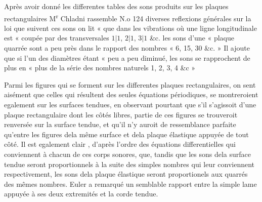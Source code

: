 \documentclass[11pt,a4paper]{article}
\begin{document}
Après avoir donné les differentes tables des sons produits
sur les plaques rectangulaires M\textsuperscript{r} Chladni rassemble N.o 124
diverses reflexions générales sur la loi que suivent ces sons
on lit « que dans les vibrations où une ligne longitudinale est
« coupée par des transversales $1|1$, $2|1$, $3|1$ \&c. les sons d'une
« plaque quarrée sont a peu près dans le rapport des nombres
« 6, 15, 30 \&c. » Il ajoute que si l'un des diamètres étant
« peu a peu diminué, les sons se rapprochent de plus en
« plus de la série des nombres naturels 1, 2, 3, 4 \&c »


Parmi les figures qui se forment sur les differentes plaques rectangulaires,
 on sent aisément que celles qui résultent des seules équations
périodiques, se montreroient egalement sur les surfaces tendues,
en observant pourtant que s'il s'agissoit d'une plaque rectangulaire
dont les côtés  libres,  partie de ces
figures se trouveroit renversée sur la surface tendue, et qu'il
n'y auroit de ressemblance parfaite qu'entre les figures
dela même surface et  dela plaque élastique appuyée
de tout côté. Il est egalement clair , d'après l'ordre
des équations differentielles qui conviennent à chacun de
ces corps sonores, que, tandis que les sons dela surface
tendue seront proportionnels à la suite des simples
nombres qui leur conviennent respectivement, les sons
dela plaque élastique seront proportionels aux
quarrés des mêmes nombres. Euler a  remarqué
un semblable rapport entre la simple lame
appuyée à ses deux extremités et la corde tendue.
\end{document}
